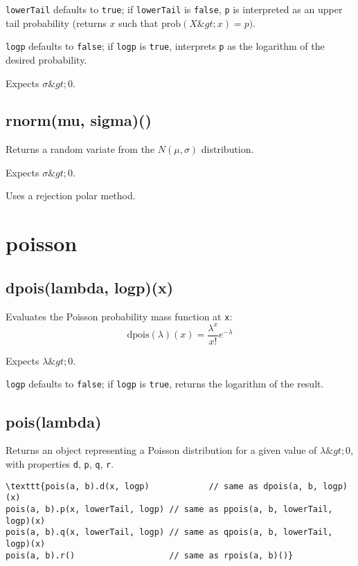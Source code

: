 \documentclass{article}
\begin{document}
\texttt{lowerTail} defaults to \texttt{true}; if \texttt{lowerTail} is \texttt{false}, \texttt{p} is
interpreted as an upper tail probability (returns
$x$ such that $\textrm{prob}(X \&gt; x) = p)$.


\texttt{logp} defaults to \texttt{false}; if \texttt{logp} is \texttt{true}, interprets \texttt{p} as
the logarithm of the desired probability.


Expects $\sigma \&gt; 0$.


    \subsection*{rnorm(mu, sigma)()}
    Returns a random variate from the $N(\mu, \sigma)$ distribution.


Expects $\sigma \&gt; 0$.


Uses a rejection polar method.


  \section{poisson}
    \subsection*{dpois(lambda, logp)(x)}
    Evaluates the Poisson probability mass function at \texttt{x}:
$$\textrm{dpois}(\lambda)(x) = \frac{\lambda^x}{x!}e^{-\lambda}$$


Expects $\lambda \&gt; 0$.


\texttt{logp} defaults to \texttt{false}; if \texttt{logp} is \texttt{true}, returns the
logarithm of the result.


    \subsection*{pois(lambda)}
    Returns an object representing a Poisson distribution
for a given value of $\lambda \&gt; 0$, with properties \texttt{d}, \texttt{p}, \texttt{q}, \texttt{r}.


\begin{lstlisting}
\texttt{pois(a, b).d(x, logp)            // same as dpois(a, b, logp)(x)
pois(a, b).p(x, lowerTail, logp) // same as ppois(a, b, lowerTail, logp)(x)
pois(a, b).q(x, lowerTail, logp) // same as qpois(a, b, lowerTail, logp)(x)
pois(a, b).r()                   // same as rpois(a, b)()}\end{lstlisting}
\end{document}
